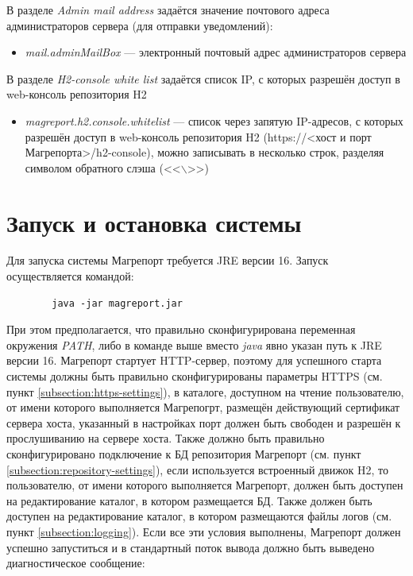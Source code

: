 \documentclass[../user-manual.tex]{subfiles}
\begin{document}
	В разделе \textit{Admin mail address} задаётся значение почтового адреса администраторов сервера (для отправки уведомлений):
	
	\begin{itemize}
		\item \textit{mail.adminMailBox} --- электронный почтовый адрес администраторов сервера
	\end{itemize}	

	В разделе \textit{H2-console white list} задаётся список IP, с которых разрешён доступ в web-консоль репозитория H2

	\begin{itemize}
		\item \textit{magreport.h2.console.whitelist} --- список через запятую IP-адресов, с которых разрешён доступ в web-консоль репозитория H2 (https://<хост и порт Магрепорта>/h2-console), можно записывать в несколько строк, разделяя символом обратного слэша (<<$\backslash$>>)
	\end{itemize}	

	
	\section{Запуск и остановка системы}
	
	Для запуска системы Магрепорт требуется JRE версии 16. Запуск осуществляется командой:

	\begin{lstlisting}
		java -jar magreport.jar
	\end{lstlisting}
	
	При этом предполагается, что правильно сконфигурирована переменная окружения \textit{PATH}, либо в команде выше вместо \textit{java} явно указан путь к JRE версии 16. Магрепорт стартует HTTP-сервер, поэтому для успешного старта системы должны быть правильно сконфигурированы параметры HTTPS (см. пункт \ref{subsection:https-settings}), в каталоге, доступном на чтение пользователю, от имени которого выполняется Магрепогрт, размещён действующий сертификат сервера хоста, указанный в настройках порт должен быть свободен и разрешён к прослушиванию на сервере хоста. Также должно быть правильно сконфигурировано подключение к БД репозитория Магрепорт (см. пункт \ref{subsection:repository-settings}), если используется встроенный движок H2, то пользователю, от имени которого выполняется Магрепорт, должен быть доступен на редактирование каталог, в котором размещается БД. Также должен быть доступен на редактирование каталог, в котором размещаются файлы логов (см. пункт \ref{subsection:logging}). Если все эти условия выполнены, Магрепорт должен успешно запуститься и в стандартный поток вывода должно быть выведено диагностическое сообщение:
	
\end{document}
